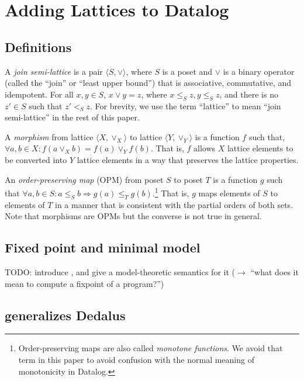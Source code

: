 \section{Adding Lattices to Datalog}
\label{sec:foundation}

\subsection{Definitions}
\label{sec:found-defn}
A \emph{join semi-lattice} is a pair $\langle S, \lor \rangle$, where $S$ is a
poset and $\lor$ is a binary operator (called the ``join'' or ``least upper
bound'') that is associative, commutative, and idempotent. For all $x, y \in S$,
$x \lor y = z$, where $x \leq_S z, y \leq_S z$, and there is no $z' \in S$ such
that $z' <_S z$. For brevity, we use the term ``lattice'' to mean ``join
semi-lattice'' in the rest of this paper.

A \emph{morphism} from lattice $\langle X, \lor_X\rangle$ to lattice $\langle Y,
\lor_Y\rangle$ is a function $f$ such that, $\forall a,b \in X: f(a \lor_X b) =
f(a) \lor_Y f(b)$. That is, $f$ allows $X$ lattice elements to be converted into
$Y$ lattice elements in a way that preserves the lattice properties.

An \emph{order-preserving map} (OPM) from poset $S$ to poset $T$ is a function
$g$ such that $\forall a,b \in S: a \leq_S b \Rightarrow g(a) \leq_T
g(b)$.\footnote{Order-preserving maps are also called \emph{monotone functions}.
  We avoid that term in this paper to avoid confusion with the normal meaning of
  monotonicity in Datalog.} That is, $g$ maps elements of $S$ to elements of $T$
in a manner that is consistent with the partial orders of both sets. Note that
morphisms are OPMs but the converse is not true in general.

\subsection{Fixed point and minimal model}

TODO: introduce \baselang, and give a model-theoretic semantics for it ($\to$
``what does it mean to compute a fixpoint of a \baselang program?'')

\subsection{\baselang generalizes Dedalus}


